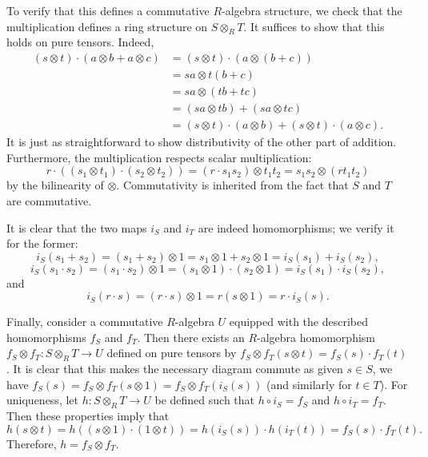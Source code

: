 \documentclass[../../master.tex]{subfiles}
\begin{document}
\begin{solution}
    To verify that this defines a commutative $R$-algebra structure, we check that the multiplication defines a ring structure on $S \otimes_R T$.
    It suffices to show that this holds on pure tensors.
    Indeed,
    \begin{align*}
        (s \otimes t) \cdot (a \otimes b + a \otimes c) &= (s \otimes t) \cdot (a \otimes (b + c)) \\
                                                        &= sa \otimes t(b + c) \\
                                                        &= sa \otimes (tb + tc) \\
                                                        &= (sa \otimes tb) + (sa \otimes tc) \\
                                                        &= (s \otimes t) \cdot (a \otimes b) + (s \otimes t) \cdot (a \otimes c).
    \end{align*}
    It is just as straightforward to show distributivity of the other part of addition.
    Furthermore, the multiplication respects scalar multiplication:
    \[
        r \cdot ((s_1 \otimes t_1) \cdot (s_2 \otimes t_2)) = (r \cdot s_1 s_2) \otimes t_1 t_2 = s_1 s_2 \otimes (r t_1 t_2)
    \]
    by the bilinearity of $\otimes$.
    Commutativity is inherited from the fact that $S$ and $T$ are commutative.

    It is clear that the two maps $i_S$ and $i_T$ are indeed homomorphisms; we verify it for the former:
    \[
        i_S(s_1 + s_2) = (s_1 + s_2) \otimes 1 = s_1 \otimes 1 + s_2 \otimes 1 = i_S(s_1) + i_S(s_2),
    \]
    \[
        i_S(s_1 \cdot s_2) = (s_1 \cdot s_2) \otimes 1 = (s_1 \otimes 1) \cdot (s_2 \otimes 1) = i_S(s_1) \cdot i_S(s_2),
    \]
    and
    \[
        i_S(r \cdot s) = (r \cdot s) \otimes 1 = r (s \otimes 1) = r \cdot i_S(s).
    \]
    
    Finally, consider a commutative $R$-algebra $U$ equipped with the described homomorphisms $f_S$ and $f_T$.
    Then there exists an $R$-algebra homomorphism $f_S \otimes f_T : S \otimes_R T \to U$ defined on pure tensors by $f_S \otimes f_T (s \otimes t) = f_S(s) \cdot f_T(t)$.
    It is clear that this makes the necessary diagram commute as given $s \in S$, we have $f_S(s) = f_S \otimes f_T (s \otimes 1) = f_S \otimes f_T (i_S(s))$ (and similarly for $t \in T$).
    For uniqueness, let $h: S \otimes_R T \to U$ be defined such that $h \circ i_S = f_S$ and $h \circ i_T = f_T$.
    Then these properties imply that
    \[
        h(s \otimes t) = h((s \otimes 1) \cdot (1 \otimes t)) = h(i_S(s)) \cdot h(i_T(t)) = f_S(s) \cdot f_T(t).
    \]
    Therefore, $h = f_S \otimes f_T$.
\end{solution}
\end{document}
